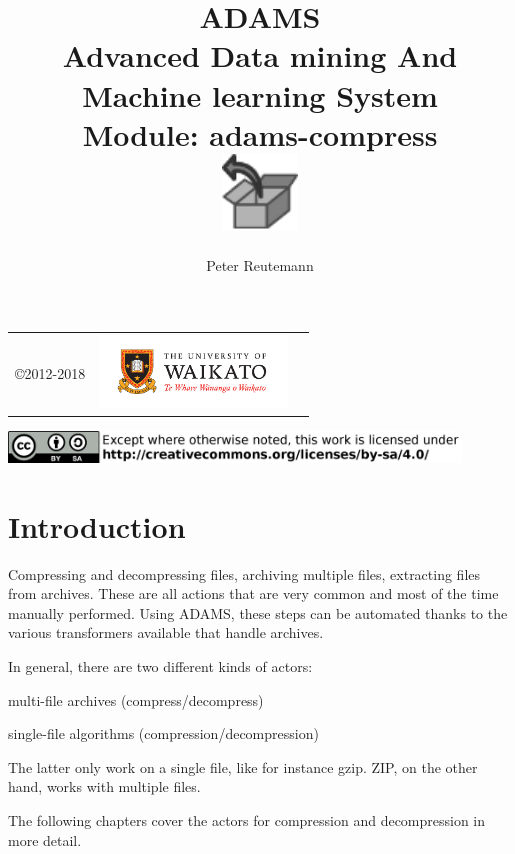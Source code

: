 \documentclass[a4paper]{book}
\title{
  \textbf{ADAMS} \\
  {\Large \textbf{A}dvanced \textbf{D}ata mining \textbf{A}nd \textbf{M}achine
  learning \textbf{S}ystem} \\
  {\Large Module: adams-compress} \\
  \vspace{1cm}
  \includegraphics[width=2cm]{images/compress-module.png} \\
}
\author{
  Peter Reutemann
}
\begin{document}
\begin{titlepage}
\maketitle

\thispagestyle{empty}
\center
\begin{table}[b]
	\begin{tabular}{c l l}
		\parbox[c][2cm]{2cm}{\copyright 2012-2018} &
		\parbox[c][2cm]{5cm}{\includegraphics[width=5cm]{images/coat_of_arms.pdf}} \\
	\end{tabular}
	\includegraphics[width=12cm]{images/cc.png} \\
\end{table}

\end{titlepage}

\tableofcontents

\chapter{Introduction}
Compressing and decompressing files, archiving multiple files, extracting files
from archives. These are all actions that are very common and most of the time
manually performed. Using ADAMS, these steps can be automated thanks to the 
various transformers available that handle archives.

In general, there are two different kinds of actors:
\begin{tight_itemize}
  \item multi-file archives (compress/decompress)
  \item single-file algorithms (compression/decompression)
\end{tight_itemize}
The latter only work on a single file, like for instance gzip. ZIP, on the
other hand, works with multiple files.

The following chapters cover the actors for compression and decompression in 
more detail.
\end{document}
